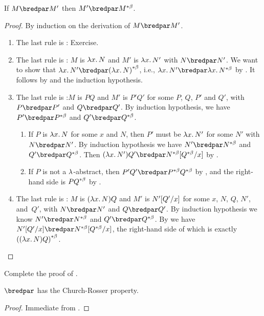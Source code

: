 \documentclass[../../../include/open-logic-section]{subfiles}
\begin{document}
\begin{lem}
  If $M \bredpar M'$ then $M' \bredpar \bcd{M}$.
\end{lem}
\begin{proof}
  By induction on the derivation of $M \bredpar M'$.
  \begin{enumerate}
    \item The last rule is : Exercise.
    \item The last rule is : $M$ is 
      $\lambd[x][N]$ and $M'$ is $\lambd[x][N']$ with
      $N \bredpar N'$. We want to show that $\lambd[x][N'] \bredpar
      \bcd{(\lambd[x][N])}$, i.e., $\lambd[x][N'] \bredpar
      \lambd[x][\bcd{N}]$ by . It follows by
       and the induction hypothesis.
    \item The last rule is :$M$ is $PQ$ and $M'$
      is $P'Q'$ for some $P$, $Q$, $P'$ and $Q'$, with $P \bredpar P'$
      and $Q \bredpar Q'$. By induction hypothesis, we have $P'
      \bredpar \bcd{P}$ and $Q' \bredpar \bcd{Q}$.
      \begin{enumerate}
        \item If $P$ is $\lambd[x][N]$ for some $x$ and $N$, then
          $P'$ must be $\lambd[x][N']$ for some $N'$ with 
          $N \bredpar N'$. By induction hypothesis we have $N' \bredpar \bcd{N}$ and
          $Q' \bredpar \bcd{Q}$. Then $(\lambd[x][N'])Q' \bredpar
          \Subst{\bcd{N}}{\bcd{Q}}{x}$ by .
        \item If $P$ is not a $\lambd$-abstract, then $P'Q' \bredpar
          \bcd{P}\bcd{Q}$ by , and the right-hand
          side is $\bcd{PQ}$ by .
      \end{enumerate}
    \item The last rule is : $M$ is
      $(\lambd[x][N])Q$  and $M'$ is $N'[Q'/x]$ for some $x$,
      $N$, $Q$, $N'$, and~$Q'$, with $N \bredpar N'$ and $Q \bredpar
      Q'$. By induction hypothesis we know $N' \bredpar \bcd{N}$ and
      $Q' \bredpar \bcd{Q}$. By  we have
      $\Subst{N'}{Q'}{x} \bredpar \Subst{\bcd{N}}{\bcd{Q}}{x}$, the
      right-hand side of which is exactly $\bcd{((\lambd[x][N])Q)}$.
  \end{enumerate}
\end{proof}

\begin{prob}
  Complete the proof of .
\end{prob}

\begin{thm}
  $\bredpar$ has the Church-Rosser property.
\end{thm}

\begin{proof}
  Immediate from .
\end{proof}
\end{document}
